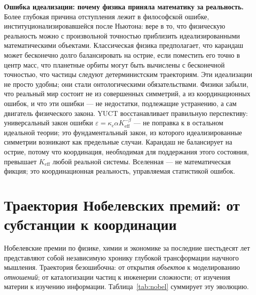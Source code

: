 \documentclass[12pt,a4paper]{article}
\begin{document}
	\textbf{Ошибка идеализации: почему физика приняла математику за реальность.} Более глубокая причина отступления лежит в философской ошибке, институционализировавшейся после Ньютона: вере в то, что физическую реальность можно с произвольной точностью приблизить идеализированными математическими объектами. Классическая физика предполагает, что карандаш может бесконечно долго балансировать на острие, если поместить его точно в центр масс, что планетные орбиты могут быть вычислены с бесконечной точностью, что частицы следуют детерминистским траекториям. Эти идеализации не просто удобны; они стали онтологическими обязательствами. Физики забыли, что реальный мир состоит не из совершенных симметрий, а из координационных ошибок, и что эти ошибки — не недостатки, подлежащие устранению, а сам двигатель физического закона. YUCT восстанавливает правильную перспективу: универсальный закон ошибки \(\varepsilon = \kappa_c \alpha K_{\mathrm{eff}}^{-\beta}\) — не поправка к в остальном идеальной теории; это фундаментальный закон, из которого идеализированные симметрии возникают как предельные случаи. Карандаш не балансирует на острие, потому что координация, необходимая для поддержания этого состояния, превышает \(K_{\mathrm{eff}}\) любой реальной системы. Вселенная — не математическая фикция; это координационная реальность, управляемая статистикой ошибок.
	
	\section{Траектория Нобелевских премий: от субстанции к координации}
	
	Нобелевские премии по физике, химии и экономике за последние шестьдесят лет представляют собой независимую хронику глубокой трансформации научного мышления. Траектория безошибочна: от открытия \emph{объектов} к моделированию \emph{отношений}; от каталогизации частиц к инженерии сложности; от изучения материи к изучению информации. Таблица~\ref{tab:nobel} суммирует эту эволюцию.
	
\end{document}
